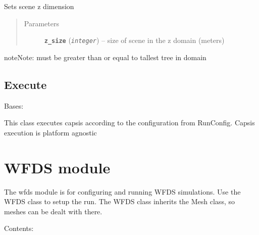 \documentclass[letterpaper,10pt,english]{sphinxmanual}
\begin{document}
\begin{fulllineitems}
\begin{fulllineitems}
\label{capsis_RunConfig:capsis.RunConfig.set_z_size}
Sets scene z dimension
\begin{quote}\begin{description}
\item[{Parameters}] \leavevmode
\textbf{\texttt{z\_size}} (\emph{\texttt{integer}}) -- size of scene in the z domain (meters)

\end{description}\end{quote}

\begin{notice}{note}{Note:}
 must be greater than or equal to tallest tree in domain
\end{notice}

\end{fulllineitems}


\end{fulllineitems}



\subsection{Execute}
\label{capsis_Execute:execute}\label{capsis_Execute::doc}

\begin{fulllineitems}
\label{capsis_Execute:capsis.Execute}
Bases: 

This class executes capsis according to the configuration from RunConfig.
Capsis execution is platform agnostic

\end{fulllineitems}



\section{WFDS module}
\label{wfds:module-wfds}\label{wfds::doc}\label{wfds:wfds-module}
The wfds module is for configuring and running WFDS simulations. Use the WFDS
class to setup the run. The WFDS class inherits the Mesh class, so meshes can
be dealt with there.

Contents:
\end{document}
